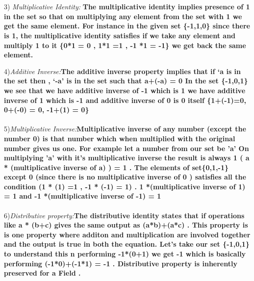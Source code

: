 \documentclass{article}
\begin{document}
\\
\\
3) \textit{Multiplicative Identity:\quad }\textbf{ The multiplicative identity implies presence of 1 in the set so that on multiplying any element from the set with 1 we get the same element. For instance in the given set \{-1,1,0\} since there is 1, the multiplicative identity satisfies if we take any element and multiply 1 to it \{0*1 = 0 , 1*1 =1 , -1 *1 = -1\} we get back the same element.  }


4)\textit{Additive Inverse:\quad}\textbf{The additive inverse property implies that if ‘a is in the set then , ‘-a’ is in the set such that a+(-a) = 0 In the set \{-1,0,1\} we see that we have additive inverse of -1 which is 1   we have additive inverse of 1 which is -1 and additive inverse of 0 is 0 itself \{1+(-1)=0, 0+(-0) = 0, -1+(1) = 0\}}
\\
\\
5)\textit{Multiplicative Inverse:\quad}\textbf{Multiplicative inverse of any number (except the number 0) is that number which when multiplied with the original number gives us one. For example let a number from our set be 'a' On multiplying 'a' with it's multiplicative inverse the result is always 1 ( a * (multiplicative inverse of a) ) = 1 . The elements of  set\{0,1,-1\} except 0 (since there is no multiplicative inverse of 0 ) satisfies all the condition 
(1 * (1) =1 , -1 * (-1) = 1) . 1 *(multiplicative inverse of 1) = 1
and -1 *(multiplicative inverse of -1) = 1}
\\
\\

6)\textit{Distributive property:\quad}\textbf{The distributive identity states that if operations like a * (b+c) gives the same output as (a*b)+(a*c) . This property is is one property where additon and multiplication are involved together and the output is true in both the equation. Let's take our set \{-1,0,1\} to understand this  
n performing -1*(0+1) we get -1 which is basically performing (-1*0)+(-1*1) = -1 . Distributive property is inherently preserved for a Field .}
\\
\\
\pagebreak 
\end{document}
